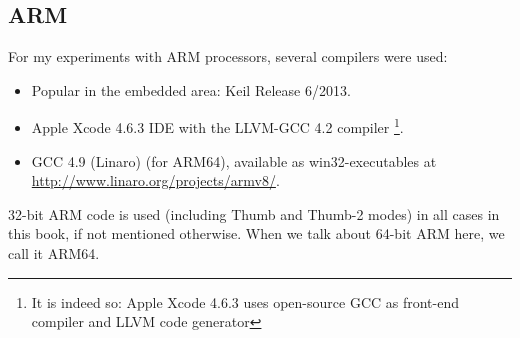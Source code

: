 \subsection{ARM}
\label{sec:hw_ARM}

\myindex{\idevices}
For my experiments with ARM processors, several compilers were used:

\begin{itemize}
\item Popular in the embedded area: Keil Release 6/2013.

\item Apple Xcode 4.6.3 IDE with the LLVM-GCC 4.2 compiler
\footnote{It is indeed so: Apple Xcode 4.6.3 uses open-source GCC as front-end compiler and LLVM 
code generator}.

\item GCC 4.9 (Linaro) (for ARM64), available as win32-executables at \url{http://www.linaro.org/projects/armv8/}.

\end{itemize}

32-bit ARM code is used (including Thumb and Thumb-2 modes) in all cases in this book, if not mentioned otherwise.
When we talk about 64-bit ARM here, we call it ARM64.







